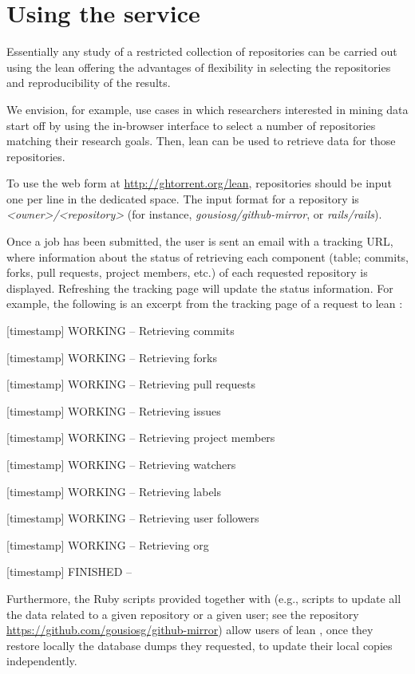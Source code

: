
\section{Using the service}
\label{sec:usage}
Essentially any study of a restricted collection of \gh repositories can be carried out using the lean \ght offering the advantages of flexibility in selecting the repositories and reproducibility of the results.

We envision, for example, use cases in which researchers interested in mining \gh data start off by using the in-browser
interface to select a number of \gh repositories matching their research goals.
Then, lean \ght can be used to retrieve data for those repositories.

To use the web form at \url{http://ghtorrent.org/lean}, repositories should be input one per line in the dedicated space.
The input format for a repository is \emph{<owner>/<repository>} (for instance, \emph{gousiosg/github-mirror}, or \emph{rails/rails}).

Once a job has been submitted, the user is sent an email with a tracking URL, where information about the status of retrieving
each component (table; commits, forks, pull requests, project members, etc.) of each requested repository is displayed.
Refreshing the tracking page will update the status information.
For example, the following is an excerpt from the tracking page of a request to lean \ght:

[timestamp] WORKING -- Retrieving commits

[timestamp] WORKING -- Retrieving forks

[timestamp] WORKING -- Retrieving pull requests

[timestamp] WORKING -- Retrieving issues

[timestamp] WORKING -- Retrieving project members

[timestamp] WORKING -- Retrieving watchers

[timestamp] WORKING -- Retrieving labels

[timestamp] WORKING -- Retrieving user followers

[timestamp] WORKING -- Retrieving org

[timestamp] FINISHED --
\vspace{0.2cm}

Furthermore, the Ruby scripts provided together with \ght (e.g., scripts to update all the data related to a given repository
or a given user; see the \ght \gh repository \url{https://github.com/gousiosg/github-mirror}) allow users of lean \ght, 
once they restore locally the database dumps they requested, to update their local copies independently.


